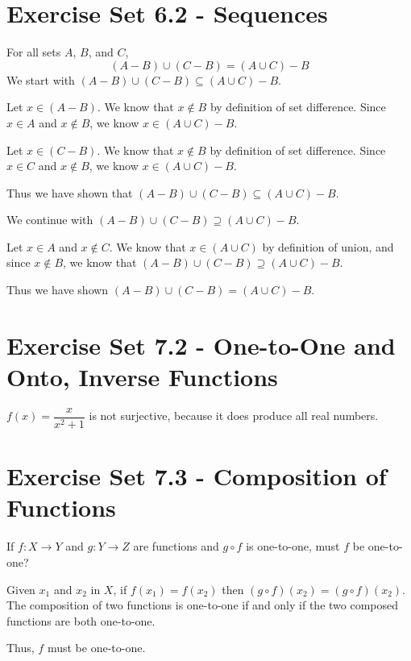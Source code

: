 \documentclass[12pt]{article}
\newenvironment{modenumerate}
  {\enumerate\setupmodenumerate}
  {\endenumerate}
\newif\ifmoditem
\newcommand{\setupmodenumerate}{%
  \global\moditemfalse
  \let\origmakelabel\makelabel
  \def\moditem##1{\global\moditemtrue\def\mesymbol{##1}\item}%
  \def\makelabel##1{%
    \origmakelabel{##1\ifmoditem\rlap{\mesymbol}\fi\enspace}%
    \global\moditemfalse}%
}
\begin{document}
\section*{Exercise Set 6.2 - Sequences}
\begin{modenumerate}

\moditem{*} %
For all sets $A$, $B$, and $C$, 
$$(A - B) \cup (C - B) = (A \cup C) - B$$
We start with $(A - B) \cup (C - B) \subseteq (A \cup C) - B$.

Let $x \in (A - B)$. We know that $x \not\in B$ by definition of set difference. Since $x \in A$ and $x
\not\in B$, we know $x \in (A \cup C) - B$.

Let $x \in (C - B)$. We know that $x \not\in B$ by definition of set difference. Since $x \in C$ and $x
\not\in B$, we know $x \in (A \cup C) - B$.

Thus we have shown that $(A - B) \cup (C - B) \subseteq (A \cup C) - B$.

We continue with $(A - B) \cup (C - B) \supseteq (A \cup C) - B$.

Let $x \in A$ and $x \not\in C$. We know that $x \in (A \cup C)$ by definition of union, and since $x \not\in
B$, we know that $(A - B) \cup (C - B) \supseteq (A \cup C) - B$.

Thus we have shown $(A - B) \cup (C - B) = (A \cup C) - B$.


\end{modenumerate}
\section*{Exercise Set 7.2 - One-to-One and Onto, Inverse Functions}
\begin{modenumerate}

\moditem{*} %
$f(x) = \dfrac{x}{x^{2}+1}$ is not surjective, because it does produce all real numbers.
\setcounter{enumi}{35}
\end{modenumerate}

\section*{Exercise Set 7.3 - Composition of Functions}
\begin{modenumerate}
\setcounter{enumi}{15}
\moditem{*} %
If $f : X \rightarrow Y$ and $g : Y \rightarrow Z$ are functions and $g \circ f$ is one-to-one, must $f$ be
one-to-one?

Given $x_{1}$ and $x_{2}$ in $X$, if $f(x_{1}) = f(x_{2})$ then $(g \circ f)(x_{2}) = (g \circ f)(x_{2})$. The
composition of two functions is one-to-one if and only if the two composed functions are both one-to-one.

Thus, $f$ must be one-to-one.
\end{modenumerate}
\end{document}
